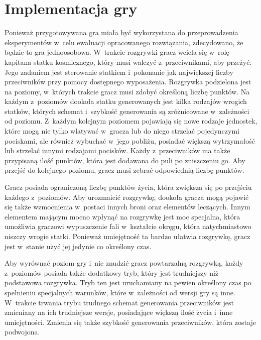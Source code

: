 \section{Implementacja gry}
Ponieważ przygotowywana gra miała być wykorzystana do przeprowadzenia eksperymentów w~celu ewaluacji opracowanego rozwiązania, zdecydowano, że będzie to gra jednoosobowa. W~trakcie rozgrywki gracz wciela się w~rolę kapitana statku kosmicznego, który musi walczyć z~przeciwnikami, aby przeżyć. Jego zadaniem jest sterowanie statkiem i~pokonanie jak największej liczby przeciwników przy pomocy dostępnego wyposażenia. Rozgrywka podzielona jest na poziomy, w~których trakcie gracz musi zdobyć określoną liczbę punktów. Na każdym z~poziomów dookoła statku generowanych jest kilka rodzajów wrogich statków, których schemat i~szybkość generowania są zróżnicowane w~zależności od poziomu. Z~każdym kolejnym poziomem pojawiają się nowe rodzaje jednostek, które mogą nie tylko wlatywać w~gracza lub do niego strzelać pojedynczymi pociskami, ale również wybuchać w~jego pobliżu, posiadać większą wytrzymałość lub strzelać innymi rodzajami pocisków. Każdy z~przeciwników ma także przypisaną ilość punktów, która jest dodawana do puli po zniszczeniu go. Aby przejść do kolejnego poziomu, gracz musi zebrać odpowiednią liczbę punktów.

Gracz posiada ograniczoną liczbę punktów życia, która zwiększa się po przejściu każdego z~poziomów. Aby urozmaicić rozgrywkę, dookoła gracza mogą pojawić się także wzmocnienia w~postaci innych broni oraz elementów leczących. Innym elementem mającym mocno wpłynąć na rozgrywkę jest moc specjalna, która umożliwia graczowi wypuszczenie fali w~kształcie okręgu, która natychmiastowo niszczy wrogie statki. Ponieważ umiejętność ta bardzo ułatwia rozgrywkę, gracz jest w~stanie użyć jej jedynie co określony czas. 

Aby wyrównać poziom gry i~nie znudzić gracz powtarzalną rozgrywką, każdy z~poziomów posiada także dodatkowy tryb, który jest trudniejszy niż podstawowa rozgrywka. Tryb ten jest uruchamiany na pewien określony czas po spełnieniu specjalnych warunków, które w~zależności od wersji gry są inne. W~trakcie trwania trybu trudnego schemat generowania przeciwników jest zmieniany na ich trudniejsze wersje, posiadające większą ilość życia i~inne umiejętności. Zmienia się także szybkość generowania przeciwników, która zostaje podwojona.

